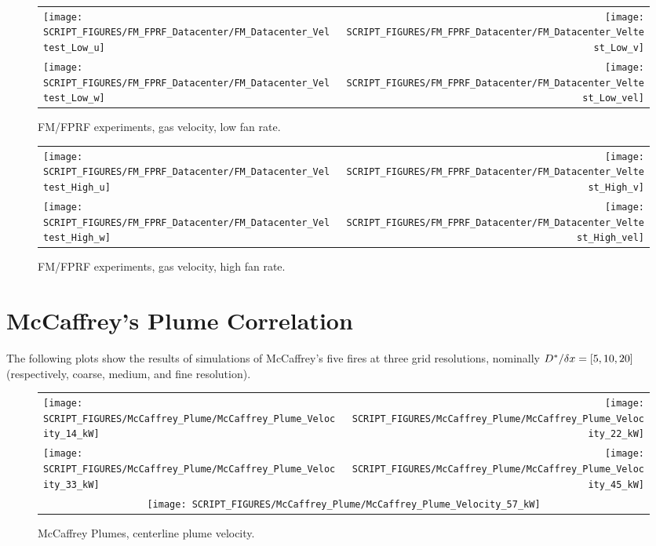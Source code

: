 \begin{figure}[ht]
\begin{tabular*}{\textwidth}{l@{\extracolsep{\fill}}r}
\texttt{[image: SCRIPT\_FIGURES/FM\_FPRF\_Datacenter/FM\_Datacenter\_Veltest\_Low\_u]} &
\texttt{[image: SCRIPT\_FIGURES/FM\_FPRF\_Datacenter/FM\_Datacenter\_Veltest\_Low\_v]} \\
\texttt{[image: SCRIPT\_FIGURES/FM\_FPRF\_Datacenter/FM\_Datacenter\_Veltest\_Low\_w]} &
\texttt{[image: SCRIPT\_FIGURES/FM\_FPRF\_Datacenter/FM\_Datacenter\_Veltest\_Low\_vel]}
\end{tabular*}
\caption[FM/FPRF experiments, gas velocity, low fan rate]{FM/FPRF experiments, gas velocity, low fan rate.}
\label{FM_Datacenter_Flow_Mapping_1}
\end{figure}

\begin{figure}[ht]
\begin{tabular*}{\textwidth}{l@{\extracolsep{\fill}}r}
\texttt{[image: SCRIPT\_FIGURES/FM\_FPRF\_Datacenter/FM\_Datacenter\_Veltest\_High\_u]} &
\texttt{[image: SCRIPT\_FIGURES/FM\_FPRF\_Datacenter/FM\_Datacenter\_Veltest\_High\_v]} \\
\texttt{[image: SCRIPT\_FIGURES/FM\_FPRF\_Datacenter/FM\_Datacenter\_Veltest\_High\_w]} &
\texttt{[image: SCRIPT\_FIGURES/FM\_FPRF\_Datacenter/FM\_Datacenter\_Veltest\_High\_vel]}
\end{tabular*}
\caption[FM/FPRF experiments, gas velocity, high fan rate]{FM/FPRF experiments, gas velocity, high fan rate.}
\label{FM_Datacenter_Flow_Mapping_2}
\end{figure}

\clearpage

\section{McCaffrey's Plume Correlation}

The following plots show the results of simulations of McCaffrey's five fires at three grid resolutions, nominally $D^*/\delta x=[5,10,20]$ (respectively, coarse, medium, and fine resolution).

\begin{figure}[h!]
\begin{tabular*}{\textwidth}{l@{\extracolsep{\fill}}r}
\texttt{[image: SCRIPT\_FIGURES/McCaffrey\_Plume/McCaffrey\_Plume\_Velocity\_14\_kW]} &
\texttt{[image: SCRIPT\_FIGURES/McCaffrey\_Plume/McCaffrey\_Plume\_Velocity\_22\_kW]} \\
\texttt{[image: SCRIPT\_FIGURES/McCaffrey\_Plume/McCaffrey\_Plume\_Velocity\_33\_kW]} &
\texttt{[image: SCRIPT\_FIGURES/McCaffrey\_Plume/McCaffrey\_Plume\_Velocity\_45\_kW]} \\
\multicolumn{2}{c}{\texttt{[image: SCRIPT\_FIGURES/McCaffrey\_Plume/McCaffrey\_Plume\_Velocity\_57\_kW]}}
\end{tabular*}
\caption[McCaffrey Plumes, centerline plume velocity]{McCaffrey Plumes, centerline plume velocity.}
\label{McCaffrey_Plume_Velocity}
\end{figure}

